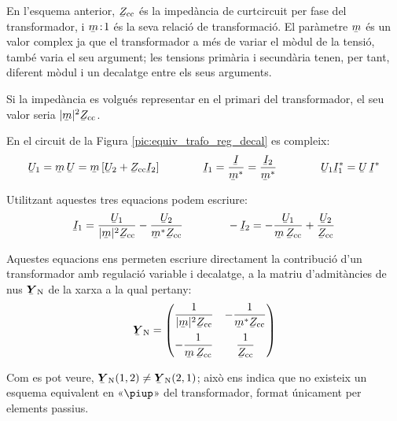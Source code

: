 En l'esquema anterior, $\cmplx{Z}\ped{cc}$ és la impedància de curtcircuit per fase del transformador, i $\cmplx{m}\!:\!1$ és la seva
relació de transformació. El paràmetre $\cmplx{m}$ és un valor
complex ja que el transformador a més de variar el mòdul de la
tensió, també varia  el seu argument; les tensions primària i
secundària tenen, per tant,  diferent mòdul i un decalatge entre els
seus arguments.

Si la impedància es volgués representar en el primari del
transformador, el seu valor seria $|\cmplx{m}|^2 \cmplx{Z}\ped{cc}$.

En el circuit de la Figura \vref{pic:equiv_trafo_reg_decal} es
compleix: 
\begin{equation}
   \cmplx{U}_1 = \cmplx{m} \,\cmplx{U} = \cmplx{m}\,
   [\cmplx{U}_2+\cmplx{Z}\ped{cc}\cmplx{I}_2]
   \qquad\qquad
   \cmplx{I}_1 = \frac{\cmplx{I}}{\cmplx{m}^*} = \frac{\cmplx{I}_2}{\cmplx{m}^*}
   \qquad\qquad
   \cmplx{U}_1 \cmplx{I}_1^* = \cmplx{U} \,\cmplx{I}^*
\end{equation}

Utilitzant aquestes tres equacions podem escriure:
\begin{equation}
   \cmplx{I}_1 = \frac{\cmplx{U}_1}{|\cmplx{m}|^2 \cmplx{Z}\ped{cc}} - \frac{\cmplx{U}_2}
   {\cmplx{m}^* \cmplx{Z}\ped{cc}} \qquad\qquad
   - \cmplx{I}_2 = - \frac{\cmplx{U}_1}{\cmplx{m} \,\cmplx{Z}\ped{cc}} + \frac{\cmplx{U}_2}
   {\cmplx{Z}\ped{cc}}
\end{equation}

Aquestes equacions ens permeten escriure directament la
contribució d'un transformador amb regulació variable i decalatge, a
la matriu d'admitàncies de nus $\mcmplx{Y}\ped{N}$ de la xarxa a la
qual pertany: 
\begin{equation} \label{eq:yn_trafo_reg_decal}
   \mcmplx{Y}\ped{N} = \begin{pmatrix}
     \dfrac{1}{|\cmplx{m}|^2 \cmplx{Z}\ped{cc}} & - \dfrac{1}
   {\cmplx{m}^* \cmplx{Z}\ped{cc}} \\[2.5ex]
     - \dfrac{1}{\cmplx{m} \,\cmplx{Z}\ped{cc}} & \dfrac{1}
   {\cmplx{Z}\ped{cc}}
   \end{pmatrix}
\end{equation}

Com es pot veure, $\mcmplx{Y}\ped{N}(1,2) \neq
\mcmplx{Y}\ped{N}(2,1)$; això ens indica que no existeix un esquema
equivalent en «$\piup$» del transformador, format únicament per
elements passius.

